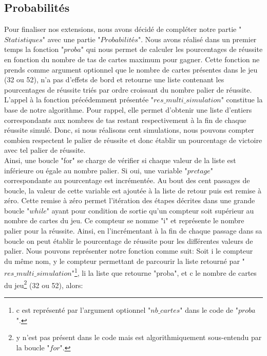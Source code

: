 \documentclass[10pt,a4paper,french,titlepage]{article}
\begin{document}
\subsection{Probabilités}
Pour finaliser nos extensions, nous avons décidé de compléter notre partie "$Statistiques$" avec une partie "$Probabilités$". Nous avons réalisé dans un premier temps la fonction "$proba$" qui nous permet de calculer les pourcentages de réussite en fonction du nombre de tas de cartes maximum pour gagner. Cette fonction
ne prends comme argument optionnel que le nombre de cartes présentes dans le jeu (32 ou 52), n'a pas d'effets de bord et retourne une liste contenant les pourcentages 
de réussite triés par ordre croissant du nombre palier de réussite. L'appel à la fonction précédemment présentée "$res\_multi\_simulation$" constitue la base de notre
algorithme. Pour rappel, elle permet d'obtenir une liste d'entiers correspondants aux nombres de tas restant respectivement à la fin de chaque réussite simulé.
Donc, si nous réalisons cent simulations, nous pouvons compter combien respectent le palier de réussite et donc établir un pourcentage de victoire avec tel palier 
de réussite.\\
Ainsi, une boucle "for" se charge de vérifier si chaque valeur de la liste est inférieure ou égale au nombre palier. Si oui, une variable "$prctage$" 
correspondante au pourcentage est incrémentée. Au bout des cent passages de boucle, la valeur de cette variable est ajoutée à la liste de retour puis est remise à 
zéro. Cette remise à zéro permet l'itération des étapes décrites dans une grande boucle "$while$" ayant pour condition de sortie qu'un compteur soit supérieur au nombre 
de cartes du jeu. Ce compteur se nomme "i" et représente le nombre palier pour la réussite. Ainsi, en l'incrémentant à la fin de chaque passage dans sa boucle on peut
établir le pourcentage de réussite pour les différentes valeurs de palier. Nous pouvons représenter notre fonction comme suit:
Soit i le compteur du même nom, y le compteur permettant de parcourir la liste retourné par "$res\_multi\_simulation$"\footnote{c est représenté par l'argument optionnel "$nb\_cartes$" dans le code de "$proba$".}, li la liste que retourne "proba", et c
le nombre de cartes du jeu\footnote{y n'est pas présent dans le code mais est algorithmiquement sous-entendu par la boucle "$for$".} (32 ou 52), alors:
\end{document}
